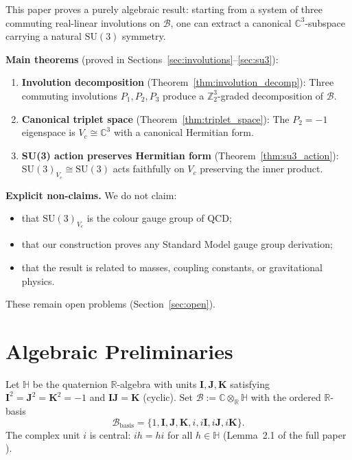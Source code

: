 \documentclass[12pt,a4paper]{article}
\theoremstyle{remark}
\begin{document}
This paper proves a purely algebraic result: starting from a system of three
commuting real-linear involutions on $\mathcal{B}$, one can extract a canonical
$\mathbb{C}^3$-subspace carrying a natural $\mathrm{SU}(3)$ symmetry.

\medskip
\noindent\textbf{Main theorems} (proved in Sections~\ref{sec:involutions}--\ref{sec:su3}):
\begin{enumerate}
  \item \textbf{Involution decomposition} (Theorem~\ref{thm:involution_decomp}):
    Three commuting involutions $P_1,P_2,P_3$ produce a $\mathbb{Z}_2^3$-graded
    decomposition of $\mathcal{B}$.
  \item \textbf{Canonical triplet space} (Theorem~\ref{thm:triplet_space}):
    The $P_2=-1$ eigenspace is $V_c\cong\mathbb{C}^3$ with a canonical
    Hermitian form.
  \item \textbf{SU(3) action preserves Hermitian form}
    (Theorem~\ref{thm:su3_action}):
    $\mathrm{SU}(3)_{V_c}\cong\mathrm{SU}(3)$ acts faithfully on $V_c$
    preserving the inner product.
\end{enumerate}

\medskip
\noindent\textbf{Explicit non-claims.}  We do not claim:
\begin{itemize}
  \item that $\mathrm{SU}(3)_{V_c}$ is the colour gauge group of QCD;
  \item that our construction proves any Standard Model gauge group derivation;
  \item that the result is related to masses, coupling constants, or gravitational physics.
\end{itemize}
These remain open problems (Section~\ref{sec:open}).

\section{Algebraic Preliminaries}
\label{sec:prelim}

Let $\mathbb{H}$ be the quaternion $\mathbb{R}$-algebra with units
$\mathbf{I},\mathbf{J},\mathbf{K}$ satisfying $\mathbf{I}^2=\mathbf{J}^2
=\mathbf{K}^2=-1$ and $\mathbf{I}\mathbf{J}=\mathbf{K}$ (cyclic).  Set
$\mathcal{B}:=\mathbb{C}\otimes_\mathbb{R}\mathbb{H}$ with the ordered
$\mathbb{R}$-basis
\[
  \mathcal{B}_\mathrm{basis} = \{1,\mathbf{I},\mathbf{J},\mathbf{K},
    i,i\mathbf{I},i\mathbf{J},i\mathbf{K}\}.
\]
The complex unit $i$ is central: $ih=hi$ for all $h\in\mathbb{H}$
(Lemma~2.1 of the full paper \cite{mainpaper}).
\end{document}
